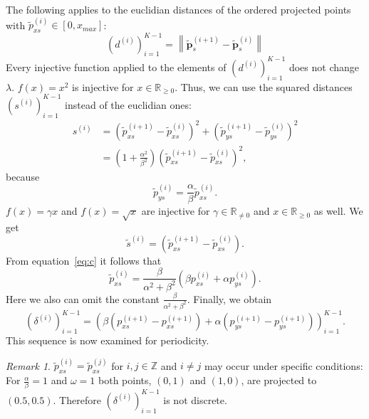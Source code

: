 \documentclass[11pt]{article}
\theoremstyle{remark}
\newtheorem{remark}{Remark}
\begin{document}
The following applies to the euclidian distances of the ordered projected points with $\tilde{p}_{x s}^{(i)} \in [0, x_{max}]$:
%
\begin{equation}
\left( d^{(i)} \right)_{i=1}^{K-1} = \left\lVert \mathbf{\tilde{p}}^{(i+1)}_s - \mathbf{\tilde{p}}^{(i)}_s \right\rVert
\end{equation}
%
Every injective function applied to the elements of $\left(d^{(i)}\right)_{i=1}^{K-1}$ does not change $\lambda$.
%
$f(x) = x^2$ is injective for $x \in \mathbb{R}_{\geq 0}$. Thus, we can use the squared distances $\left(s^{(i)}\right)_{i=1}^{K-1}$ instead of the euclidian ones:
%
\begin{align}
s^{(i)} &= \left(\tilde{p}_{x s}^{(i+1)} - \tilde{p}_{x s}^{(i)}\right)^2 + \left(\tilde{p}_{y s}^{(i+1)} - \tilde{p}_{y s}^{(i)}\right)^2 \\
                                 &= \left(1 + \frac{\alpha^2}{\beta^2} \right) \left(\tilde{p}_{x s}^{(i+1)} - \tilde{p}_{x s}^{(i)}\right)^2,
\end{align}
%
because
%
\begin{equation}
\tilde{p}_{y s}^{(i)} = \frac{\alpha}{\beta} \tilde{p}_{x s}^{(i)}.
\end{equation}
%
$f(x) = \gamma x$ and $f(x) = \sqrt{x}$ are injective for $\gamma \in \mathbb{R}_{\ne 0}$ and $x \in \mathbb{R}_{\geq 0}$ as well. We get
%
\begin{equation}
\tilde{s}^{(i)} = \left(\tilde{p}_{x s}^{(i+1)} - \tilde{p}_{x s}^{(i)}\right).
\end{equation}
%
From equation~\eqref{eq:c} it follows that
%
\begin{equation}
\tilde{p}_{x s}^{(i)} = \frac{\beta}{\alpha^2 + \beta^2} \left( \beta p_{x s}^{(i)} + \alpha p_{y s}^{(i)} \right).
\end{equation}
%
Here we also can omit the constant $\frac{\beta}{\alpha^2 + \beta^2}$. Finally, we obtain
%
\begin{equation}
\left(\delta^{(i)}\right)_{i=1}^{K-1} =
\left( 
	\beta \left( p_{x s}^{(i+1)} - p_{x s}^{(i+1)} \right)
	+ \alpha \left( p_{y s}^{(i+1)} - p_{y s}^{(i+1)} \right) 
\right)_{i=1}^{K-1}.
\label{delta}
\end{equation}
%
This sequence is now examined for periodicity.

\begin{remark}
$\tilde{p}_{x s}^{(i)} = \tilde{p}_{x s}^{(j)}$ for $i, j \in \mathbb{Z}$ and $i \ne j$ may occur under specific conditions: For $\frac{\alpha}{\beta} = 1$ and $\omega = 1$ both points, $(0, 1)$ and $(1, 0)$, are projected to $(0.5, 0.5)$. Therefore $\left(\delta^{(i)}\right)_{i=1}^{K-1}$ is not discrete.
\end{remark}
\end{document}

